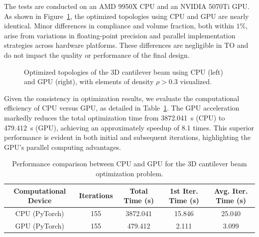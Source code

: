 \documentclass[mathpazo]{cicp}
\begin{document}
The tests are conducted on an AMD 9950X CPU and an NVIDIA 5070Ti GPU. As shown in Figure~\ref{fig:canti3d_device_compare}, the optimized topologies using CPU and GPU are nearly identical. Minor differences in compliance and volume fraction, both within $1\%$, arise from variations in floating-point precision and parallel implementation strategies across hardware platforms. These differences are negligible in TO and do not impact the quality or performance of the final design.
\begin{figure}[htbp]
	\centering
	\caption{Optimized topologies of the 3D cantilever beam using CPU (left) and GPU (right), with elements of density $\rho > 0.3$ visualized.}
	\label{fig:canti3d_device_compare}
\end{figure}

Given the consistency in optimization results, we evaluate the computational efficiency of CPU versus GPU, as detailed in Table~\ref{tab:device_performance}. The GPU acceleration markedly reduces the total optimization time from \SI{3872.041}{s} (CPU) to \SI{479.412}{s} (GPU), achieving an approximately speedup of 8.1 times. This superior performance is evident in both initial and subsequent iterations, highlighting the GPU's parallel computing advantages.
\begin{table}[htbp]
	\centering
	\setlength{\tabcolsep}{4pt} %
	\caption{Performance comparison between CPU and GPU for the 3D cantilever beam optimization problem.}
	\begin{tabular}{ccccc}
		\toprule
		\textbf{Computational Device} & \textbf{Iterations} & \textbf{Total Time (s)} & \textbf{1st Iter. Time (s)} & \textbf{Avg. Iter. Time (s)} \\
		\midrule
		CPU (PyTorch) & 155 & 3872.041 & 15.846 & 25.040 \\
		GPU (PyTorch) & 155 & 479.412 & 2.111 & 3.099 \\
		\bottomrule
	\end{tabular}
	\label{tab:device_performance}
\end{table}
\end{document}
